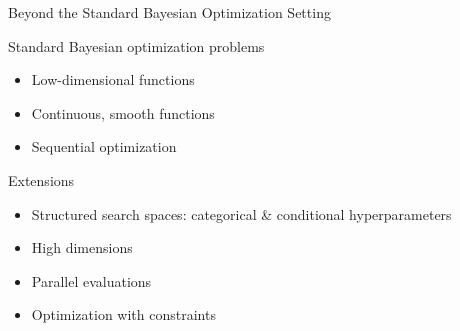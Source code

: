 
\begin{frame}{Beyond the Standard Bayesian Optimization Setting}
\begin{block}{Standard Bayesian optimization problems}
\begin{itemize}
    \item Low-dimensional functions
    \item Continuous, smooth functions
    \item Sequential optimization
\end{itemize}
\end{block}
\medskip
\begin{block}{Extensions}
\begin{itemize}
    \item Structured search spaces: categorical \& conditional hyperparameters 
	\item High dimensions
    \item Parallel evaluations
    \item Optimization with constraints
\end{itemize}
\end{block}    
\end{frame}

